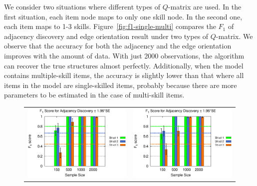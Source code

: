 \documentclass{edm_template}
\begin{document}
	We consider two situations where different types of $Q$-matrix are used. In the first situation,
	each item node maps to only one skill node. In the second one, each item maps to 1-3 skills. 
	Figure~\ref{fig:f1-single-multi} compares the $F_1$ of adjacency discovery and edge orientation result under two types of $Q$-matrix.
	We observe that the accuracy for both the adjacency and the edge orientation  improves with the amount of data.
	With just 2000 observations, the algorithm can recover the true structures almost perfectly.
	Additionally, when the model contains multiple-skill items, the accuracy is slightly lower than that where all items in the model are single-skilled items,
	probably because there are more parameters to be estimated in the case of multi-skill items. 
	
	\begin{figure}[!ht]
		\begin{center}
			\begin{tabular}{>{\centering}m{1.5in} >{\centering\arraybackslash}m{1.5in}}
				\includegraphics[width=1.1\linewidth]{figures/F1A_single.eps} &\includegraphics[width=1.1\linewidth]{figures/F1A_multi.eps}\\

\end{tabular}
\end{center}
\end{figure}
\end{document}
